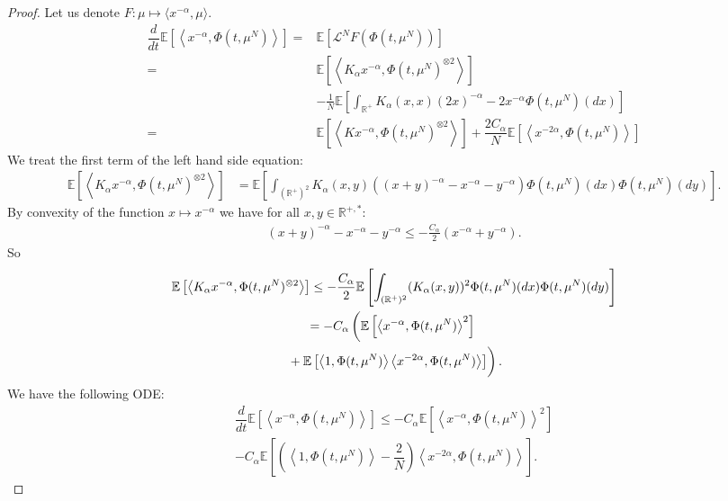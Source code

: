 \documentclass[11pt,a4paper]{article}
\newcommand{\RR}{\mathbb{R}}
\newcommand{\LC}{\mathcal{L}}
\newcommand{\E}[1]{\mathbb{E}\left[#1\right]}
\begin{document}
\begin{proof}
    Let us denote $F : \mu \mapsto \langle x^{-\alpha},\mu \rangle$.
    \begin{align*}
        \dfrac{d}{dt} \E{\left\langle x^{-\alpha},\Phi(t,\mu^N)\right\rangle} 
        =& \E{\LC^N F\left( \Phi(t,\mu^N)\right)}\\
        =& \E{\left\langle K_\alpha x^{-\alpha}, \Phi(t,\mu^N)^{\otimes 2}\right\rangle} 
        \\&- \frac{1}{N}\E{\int_{\RR^+} K_\alpha(x,x) (2x)^{-\alpha} - 2x^{-\alpha}\Phi(t,\mu^N)(dx)}\\
        =& \E{\left\langle Kx^{-\alpha}, \Phi(t,\mu^N)^{\otimes 2}\right\rangle} 
        + \dfrac{2C_\alpha}{N}\E{\left\langle x^{-2\alpha},\Phi(t,\mu^N)\right\rangle}
    \end{align*}
    We treat the first term of the left hand side equation:
    \begin{align*}
        \E{\left\langle K_\alpha x^{-\alpha}, \Phi(t,\mu^N)^{\otimes 2}\right\rangle} 
        &= \E{\int_{(\RR^+)^2} K_\alpha(x,y) \left((x+y)^{-\alpha} - x^{-\alpha} -y^{-\alpha}\right) \Phi(t,\mu^N)(dx)\Phi(t,\mu^N)(dy)}.
    \end{align*}
    By convexity of the function $x \mapsto x^{-\alpha}$ we have for all $x,y \in \RR^{+,*}$:
    \begin{align*}
        (x+y)^{-\alpha} - x^{-\alpha} -y^{-\alpha} \leq -\frac{C_\alpha}{2}\left(x^{-\alpha} + y^{-\alpha}\right).
    \end{align*}
    So
    \begin{multline*}
        \E{\left\langle K_\alpha x^{-\alpha}, \Phi(t,\mu^N)^{\otimes 2}\right\rangle} 
        \leq - \frac{C_\alpha}{2}\E{\int_{(\RR^+)^2} (K_\alpha(x,y))^2  \Phi(t,\mu^N)(dx)\Phi(t,\mu^N)(dy)}\\
        = - C_\alpha\left(\E{\left\langle x^{-\alpha},\Phi(t,\mu^N)\right\rangle^2}\vphantom{\dfrac{A}{B}} \right.\\
        \left.\vphantom{\dfrac{A}{B}}+ \E{\left\langle 1,\Phi(t,\mu^N)\right\rangle\left\langle x^{-2\alpha},\Phi(t,\mu^N)\right\rangle}\right).
    \end{multline*}
    We have the following ODE:
    \begin{multline*}
         \dfrac{d}{dt} \E{\left\langle x^{-\alpha},\Phi(t,\mu^N)\right\rangle} \leq -C_\alpha\E{\left\langle x^{-\alpha},\Phi(t,\mu^N)\right\rangle^2} 
         \\- C_\alpha \E{\left(\left\langle 1,\Phi(t,\mu^N)\right\rangle - \dfrac{2}{N}\right)\left\langle x^{-2\alpha},\Phi(t,\mu^N)\right\rangle}.

\end{multline*}
\end{proof}
\end{document}
